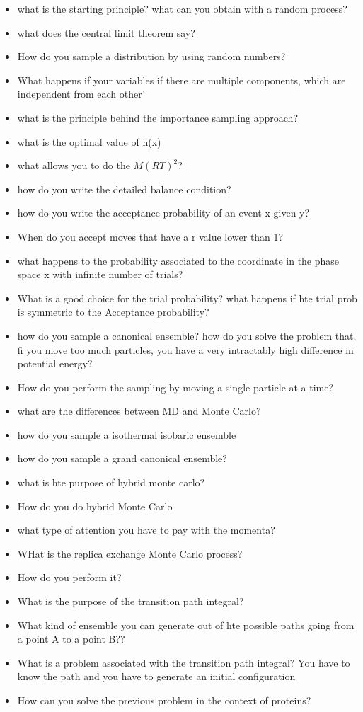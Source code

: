 \begin{enumerate}
\begin{itemize}
        \item what is the starting principle? what can you obtain with a random process?
        \item what does the central limit theorem say? 
        \item How do you sample a distribution by using random numbers?
        \item What happens if your variables if there are multiple components, which are independent from each other'
        \item what is the principle behind the importance sampling approach?
        \item what is the optimal value of h(x)
        \item what allows you to do the $M(RT)^2$?
        \item how do you write the detailed balance condition?
        \item how do you write the acceptance probability of an event x given y?
        \item When do you accept moves that have a r value lower than 1?
        \item what happens to the probability associated to the coordinate in the phase space x with infinite number of trials?
        \item What is a good choice for the trial probability? what happens if hte trial prob is symmetric to the Acceptance probability?
        \item how do you sample a canonical ensemble? how do you solve the problem that, fi you move too much particles, you have a very intractably high difference in potential energy?
        \item How do you perform the sampling by moving a single particle at a time?
        \item what are the differences between MD and Monte Carlo?
        \item how do you sample a isothermal isobaric ensemble
        \item how do you sample a grand canonical ensemble?
        \item what is hte purpose of hybrid monte carlo?
        \item How do you do hybrid Monte Carlo
        \item what type of attention you have to pay with the momenta?
        \item WHat is the replica exchange Monte Carlo process?
        \item How do you perform it?
        \item What is the purpose of the transition path integral?
        \item What kind of ensemble you can generate out of hte possible paths going from a point A to a point B??
        \item What is a problem associated with the transition path integral? You have to know the path and you have to generate an initial configuration
        \item How can you solve the previous problem in the context of proteins?
    \end{itemize}

\end{enumerate}
